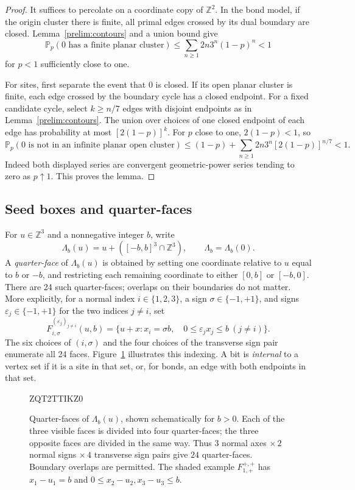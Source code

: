 \documentclass[11pt]{article}
\theoremstyle{definition}
\theoremstyle{remark}
\numberwithin{equation}{section}
\begin{document}
\begin{proof}
It suffices to percolate on a coordinate copy of $\mathbb Z^2$. In the bond
model, if the origin cluster there is finite, all primal edges crossed by its
dual boundary are closed. Lemma~\ref{prelim:contours} and a union bound give
\[
 \mathbb P_p(0\text{ has a finite planar cluster})
 \le \sum_{n\ge1}2n3^n(1-p)^n<1
\]
for $p<1$ sufficiently close to one.

For sites, first separate the event that $0$ is closed. If its open planar
cluster is finite, each edge crossed by the boundary cycle has a closed
endpoint. For a fixed candidate cycle, select $k\ge n/7$ edges with disjoint
endpoints as in Lemma~\ref{prelim:contours}. The union over choices of one
closed endpoint of each edge has probability at most $[2(1-p)]^k$.
For $p$ close to one, $2(1-p)<1$, so
\[
 \mathbb P_p(0\text{ is not in an infinite planar open cluster})
 \le (1-p)+\sum_{n\ge1}2n3^n[2(1-p)]^{n/7}<1.
\]
Indeed both displayed series are convergent geometric-power series tending
to zero as $p\uparrow1$. This proves the lemma.
\end{proof}

\subsection{Seed boxes and quarter-faces}

For $u\in\mathbb Z^3$ and a nonnegative integer $b$, write
\[
 \Lambda_b(u)=u+([-b,b]^3\cap\mathbb Z^3),\qquad \Lambda_b=\Lambda_b(0).
\]
A \emph{quarter-face} of $\Lambda_b(u)$ is obtained by setting one coordinate
relative to $u$ equal to $b$ or $-b$, and restricting each remaining coordinate
to either $[0,b]$ or $[-b,0]$. There are 24 such quarter-faces; overlaps on their
boundaries do not matter. More explicitly, for a normal index
$i\in\{1,2,3\}$, a sign $\sigma\in\{-1,+1\}$, and signs
$\varepsilon_j\in\{-1,+1\}$ for the two indices $j\ne i$, set
\begin{equation}\label{prelim:face-index}
 F_{i,\sigma}^{(\varepsilon_j)_{j\ne i}}(u,b)
 =\{u+x:x_i=\sigma b,\quad
                  0\le\varepsilon_jx_j\le b\ (j\ne i)\}.
\end{equation}
The six choices of $(i,\sigma)$ and the four choices of the transverse
sign pair enumerate all 24 faces. Figure~\ref{prelim:quarterfaces-figure}
illustrates this indexing.
A bit is \emph{internal} to a vertex set if it is a
site in that set, or, for bonds, an edge with both endpoints in that set.

\begin{figure}[tbp]

ZQT2TTIKZ0
\caption{Quarter-faces of $\Lambda_b(u)$, shown schematically for $b>0$.
Each of the three visible faces is divided into four quarter-faces;
the three opposite faces are divided in the same way.
Thus $3$ normal axes $\times\,2$ normal signs $\times\,4$ transverse sign pairs
give $24$ quarter-faces. Boundary overlaps are permitted.
The shaded example $F_{1,+}^{+,+}$ has $x_1-u_1=b$ and
$0\le x_2-u_2,x_3-u_3\le b$.}
\label{prelim:quarterfaces-figure}

\end{figure}
\end{document}
